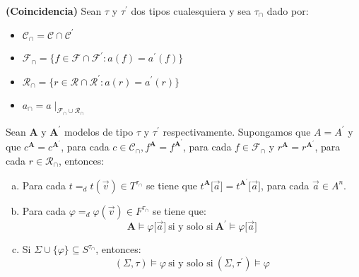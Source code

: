   \begin{lemma} \label{lemma_80}
    \PN \textbf{(Coincidencia)} Sean $\tau$ y $\tau^{\prime}$ dos tipos cualesquiera y sea $\tau_{\cap}$ dado por:
    \begin{itemize}
      \item $\mathcal{C}_{\cap} = \mathcal{C} \cap \mathcal{C}^{\prime}$
      \item $\mathcal{F}_{\cap} = \{f \in \mathcal{F} \cap \mathcal{F}^{\prime}: a(f) = a^{\prime}(f)\}$
      \item $\mathcal{R}_{\cap} = \{r \in \mathcal{R} \cap \mathcal{R}^{\prime}: a(r) = a^{\prime}(r)\}$
      \item $a_{\cap} = a\mid_{\mathcal{F}_{\cap} \cup \mathcal{R}_{\cap}}$
    \end{itemize}

    \PN Sean $\mathbf{A}$ y $\mathbf{A}^{\prime}$ modelos de tipo $\tau$ y $\tau^{\prime}$ respectivamente. Supongamos
    que $A = A^{\prime}$ y que $c^{\mathbf{A}} = c^{\mathbf{A}^{\prime}}$, para cada $c \in \mathcal{C}_{\cap},
    f^{\mathbf{A}} = f^{\mathbf{A}^{\prime}}$, para cada $f \in \mathcal{F}_{\cap}$ y $r^{\mathbf{A}} =
    r^{\mathbf{A}^{\prime}}$, para cada $r \in \mathcal{R}_{\cap}$, entonces:
    \begin{enumerate}[(a)]
      \item Para cada $t =_{d} t(\vec{v}) \in T^{\tau_{\cap}}$ se tiene que $t^{\mathbf{A}} \lbrack \vec{a} \rbrack =
      t^{\mathbf{A}^{\prime}} \lbrack \vec{a} \rbrack$, para cada $\vec{a} \in A^{n}$.
      \item Para cada $\varphi =_{d} \varphi (\vec{v}) \in F^{\tau_{\cap}}$ se tiene que:
      \[
        \mathbf{A} \models \varphi \lbrack \vec{a} \rbrack \ \text{si y solo si} \ \mathbf{A}^{\prime} \models \varphi
        \lbrack \vec{a} \rbrack
      \]
      \item Si $\Sigma \cup \{\varphi\} \subseteq S^{\tau_{\cap}}$, entonces:
      \[
        (\Sigma, \tau) \models \varphi \ \text{si y solo si} \ (\Sigma, \tau^{\prime}) \models \varphi
      \]
    \end{enumerate}
  \end{lemma}
